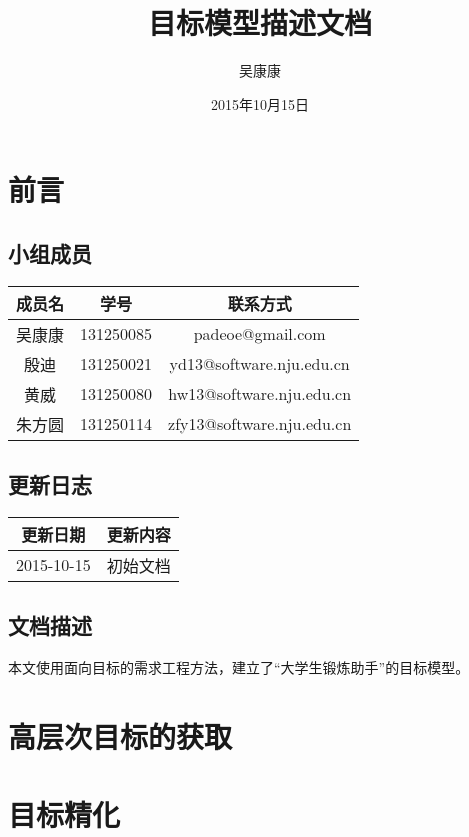 \documentclass[UTF8]{ctexart}
\title{目标模型描述文档}
\author{吴康康}
\date{2015年10月15日}
\begin{document}
\maketitle
\tableofcontents

\section{前言}

\subsection{小组成员}

\begin{center}
\begin{tabular}{|c|c|c|}
\hline
成员名&学号&联系方式\\
\hline
吴康康&131250085&padeoe@gmail.com\\
\hline
殷迪&131250021&yd13@software.nju.edu.cn\\
\hline
黄威&131250080&hw13@software.nju.edu.cn\\
\hline
朱方圆&131250114&zfy13@software.nju.edu.cn\\
\hline
\end{tabular}
\end{center}

\subsection{更新日志}

\begin{center}
\begin{tabular}{|c|c|}
\hline
更新日期&更新内容\\
\hline
2015-10-15&初始文档\\
\hline
\end{tabular}
\end{center}

\subsection{文档描述}
  本文使用面向目标的需求工程方法，建立了“大学生锻炼助手”的目标模型。

\section{高层次目标的获取}


\section{目标精化}
\end{document}
